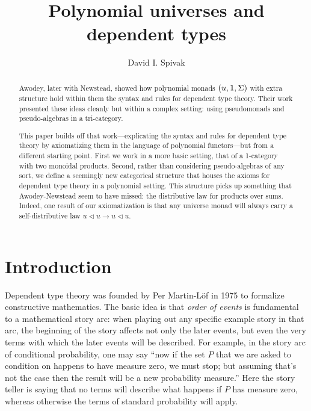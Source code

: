 \documentclass[11pt, one side, article]{memoir}
\theoremstyle{definition}
\theoremstyle{plain}
\newcommand{\0}{\textsf{0}}
\newcommand{\1}{\tn{\textsf{1}}}
\newcommand{\tri}{\mathbin{\triangleleft}}
\begin{document}
\title{Polynomial universes and dependent types}

\author{David I. Spivak}

\date{\vspace{-.2in}}

\maketitle

\begin{abstract}
Awodey, later with Newstead, showed how polynomial monads $(u,\1,\Sigma)$ with extra structure hold within them the syntax and rules for dependent type theory. Their work presented these ideas cleanly but within a complex setting: using pseudomonads and pseudo-algebras in a tri-category.

This paper builds off that work---explicating the syntax and rules for dependent type theory by axiomatizing them in the language of polynomial functors---but from a different starting point. First we work in a more basic setting, that of a 1-category with two monoidal products. Second, rather than considering pseudo-algebras of any sort, we define a seemingly new categorical structure that houses the axioms for dependent type theory in a polynomial setting. This structure picks up something that Awodey-Newstead seem to have missed: the distributive law for products over sums. Indeed, one result of our axiomatization is that any universe monad will always carry a self-distributive law $u\tri u\to u\tri u$.
\end{abstract}


\chapter{Introduction}



Dependent type theory \cite{martin-lof1975intuitionistic} was founded by Per Martin-L\"{o}f in 1975 to formalize constructive mathematics. The basic idea is that \emph{order of events} is fundamental to a mathematical story arc: when playing out any specific example story in that arc, the beginning of the story affects not only the later events, but even the very terms with which the later events will be described. For example, in the story arc of conditional probability, one may say ``now if the set $P$ that we are asked to condition on happens to have measure zero, we must stop; but assuming that's not the case then the result will be a new probability measure.'' Here the story teller is saying that no terms will describe what happens if $P$ has measure zero, whereas otherwise the terms of standard probability will apply.
\end{document}
